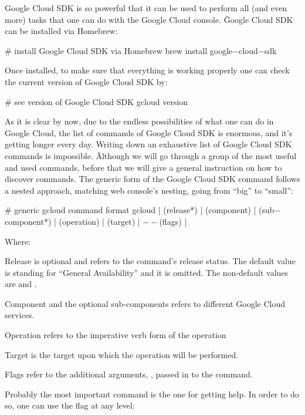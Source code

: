 Google Cloud SDK is so powerful that it can be used to perform all (and even more) tasks that one can do with the
Google Cloud console. \v

Google Cloud SDK can be installed via Homebrew:
\begin{bash}
# install Google Cloud SDK via Homebrew
brew install google$-$cloud$-$sdk
\end{bash}

Once installed, to make sure that everything is working properly one can check the current version of Google Cloud
SDK by:
\begin{bash}
# see version of Google Cloud SDK
gcloud version
\end{bash}

As it is clear by now, due to the endless possibilities of what one can do in Google Cloud, the list of commands of
Google Cloud SDK is enormous, and it's getting longer every day. Writing down an exhaustive list of Google Cloud SDK
commands is impossible. \v

Although we will go through a group of the most useful and used commands, before that we will give a general instruction
on how to discover commands. The generic form of the Google Cloud SDK command follows a nested approach, matching web
console's nesting, going from ``big'' to ``small'':
\begin{bash}
# generic gcloud command format
gcloud | (release*) | (component) | (sub$-$component*) | (operation) | (target) | $--$(flags) |
\end{bash}

Where:
\bit
\item Release is optional and refers to the command’s release status. The default value is  standing for
``General Availability'' and it is omitted. The non-default values are  and .
\item Component and the optional sub-components refers to different Google Cloud services.
\item Operation refers to the imperative verb form of the operation
\item Target is the target upon which the operation will be performed.
\item Flags refer to the additional arguments, , passed in to the command.
\eit

Probably the most important command is the one for getting help. In order to do so, one can use the flag 
at any  level:

